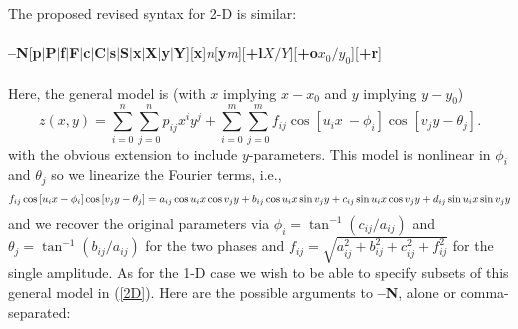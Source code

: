 \documentclass[12pt,letterpaper,margin=0.5in]{report}
\begin{document}
The proposed revised syntax for 2-D is similar:
\\ \\
{\bf --N}[{\bf p}$|${\bf P}$|${\bf f}$|${\bf F}$|${\bf c}$|${\bf C}$|${\bf s}$|${\bf S}$|${\bf x}$|${\bf X}$|${\bf y}$|${\bf Y}][{\bf x}]{\it n}[{\bf y}{\it m}][{\bf +l}$X/Y$][{\bf +o}$x_0/y_0$][{\bf +r}]
\\ \\
Here, the general model is (with $x$ implying $x - x_0$ and $y$ implying $y - y_0$)
\begin{equation}
z(x,y) = \sum_{i = 0}^n \sum_{j = 0}^n p_{ij} x^iy^j + \sum_{i = 0}^m \sum_{j = 0}^m f_{ij} \cos \left [u_i x \
	- \phi_i \right ] \cos \left [v_j y - \theta_j \right ] .
\label{2D}
\end{equation}
with the obvious extension to include $y$-parameters.
This model is nonlinear in $\phi_i$ and $\theta_j$ so we linearize the Fourier terms, i.e.,
\begin{dmath}
f_{ij} \cos \left [u_i x- \phi_i \right ] \cos \left [v_j y - \theta_j \right ] =
a_{ij} \cos u_i x \cos v_j y + b_{ij} \cos u_i x \sin v_j y + \\
c_{ij} \sin u_i x \cos v_j y + d_{ij} \sin u_i x \sin v_j y
\end{dmath}
and we recover the original parameters via $\phi_i = \tan^{-1}(c_{ij}/a_{ij})$ and $\theta_j = \tan^{-1}(b_{ij}/a_{ij})$
for the two phases and $f_{ij} = \sqrt{a_{ij}^2 + b_{ij}^2 + c_{ij}^2 + f_{ij}^2}$ for the single amplitude.
As for the 1-D case
we wish to be able to specify subsets of this general model in (\ref{2D}).  Here are the possible arguments to {\bf --N}, alone or comma-separated:
\end{document}
